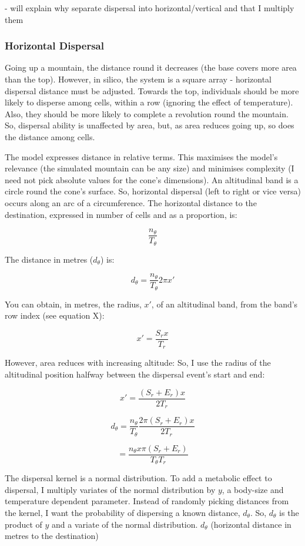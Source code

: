 \documentclass[11pt]{article}
\begin{document}
- will explain why separate dispersal into horizontal/vertical and that I multiply them

\subsubsection{Horizontal Dispersal}
Going up a mountain, the distance round it decreases (the base covers more area than the top). However, in silico, the system is a square array - horizontal dispersal distance must be adjusted. Towards the top, individuals should be more likely to disperse among cells, within a row (ignoring the effect of temperature). Also, they should be more likely to complete a revolution round the mountain. So, dispersal ability is unaffected by area, but, as area reduces going up, so does the distance among cells.

The model expresses distance in relative terms. This maximises the model's relevance (the simulated mountain can be any size) and minimises complexity (I need not pick absolute values for the cone's dimensions). An altitudinal band is a circle round the cone's surface. So, horizontal dispersal (left to right or vice versa) occurs along an arc of a circumference. The horizontal distance to the destination, expressed in number of cells and as a proportion, is:

$$\frac{n_\theta}{T_\theta}$$

The distance in metres ($d_\theta$) is:

$$d_\theta = \frac{n_\theta}{T_\theta} 2\pi x'$$

You can obtain, in metres, the radius, $x'$, of an altitudinal band, from the band's row index (see equation X):

$$x' = \frac{S_r x}{T_r}$$

However, area reduces with increasing altitude: So, I use the radius of the altitudinal position halfway between the dispersal event's start and end:

$$x' = \frac{(S_r + E_r)x}{2T_r}$$

$$d_\theta = \frac{n_\theta}{T_\theta} \frac{2\pi (S_r + E_r)x}{2T_r}$$

$$= \frac{n_\theta x \pi (S_r + E_r)}{T_\theta T_r}$$

The dispersal kernel is a normal distribution. To add a metabolic effect
to dispersal,
I multiply variates of the normal distribution by $y$, a body-size and temperature dependent parameter. Instead of randomly picking distances from the kernel, I want the probability of dispersing a known distance, $d_\theta$. So, $d_\theta$ is the product of $y$ and a variate of the normal distribution.
$d_\theta$ (horizontal distance in metres to the destination)
\end{document}
